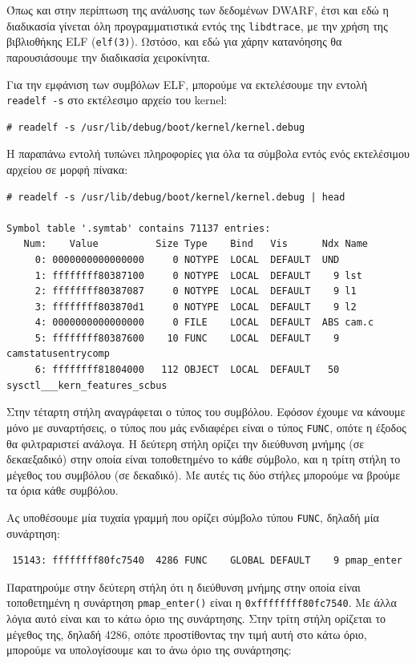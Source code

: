 \documentclass[12pt]{article}
\begin{document}
Όπως και στην περίπτωση της ανάλυσης των δεδομένων DWARF, έτσι και εδώ η
διαδικασία γίνεται όλη προγραμματιστικά εντός της \lstinline{libdtrace}, με την
χρήση της βιβλιοθήκης ELF (\lstinline{elf(3)}). Ωστόσο, και εδώ για χάρην
κατανόησης θα παρουσιάσουμε την διαδικασία χειροκίνητα.

Για την εμφάνιση των συμβόλων ELF, μπορούμε να εκτελέσουμε την εντολή
\lstinline{readelf -s} στο εκτέλεσιμο αρχείο του kernel:

\begin{lstlisting}
# readelf -s /usr/lib/debug/boot/kernel/kernel.debug
\end{lstlisting}

Η παραπάνω εντολή τυπώνει πληροφορίες για όλα τα σύμβολα εντός ενός εκτελέσιμου
αρχείου σε μορφή πίνακα:

\begin{lstlisting}
# readelf -s /usr/lib/debug/boot/kernel/kernel.debug | head

Symbol table '.symtab' contains 71137 entries:
   Num:    Value          Size Type    Bind   Vis      Ndx Name
     0: 0000000000000000     0 NOTYPE  LOCAL  DEFAULT  UND
     1: ffffffff80387100     0 NOTYPE  LOCAL  DEFAULT    9 lst
     2: ffffffff80387087     0 NOTYPE  LOCAL  DEFAULT    9 l1
     3: ffffffff803870d1     0 NOTYPE  LOCAL  DEFAULT    9 l2
     4: 0000000000000000     0 FILE    LOCAL  DEFAULT  ABS cam.c
     5: ffffffff80387600    10 FUNC    LOCAL  DEFAULT    9 camstatusentrycomp
     6: ffffffff81804000   112 OBJECT  LOCAL  DEFAULT   50 sysctl___kern_features_scbus
\end{lstlisting}

Στην τέταρτη στήλη αναγράφεται ο τύπος του συμβόλου. Εφόσον έχουμε να κάνουμε
μόνο με συναρτήσεις, ο τύπος που μάς ενδιαφέρει είναι ο τύπος \lstinline{FUNC},
οπότε η έξοδος θα φιλτραριστεί ανάλογα. Η δεύτερη στήλη ορίζει την διεύθυνση
μνήμης (σε δεκαεξαδικό) στην οποία είναι τοποθετημένο το κάθε σύμβολο, και η
τρίτη στήλη το μέγεθος του συμβόλου (σε δεκαδικό). Με αυτές τις δύο στήλες
μπορούμε να βρούμε τα όρια κάθε συμβόλου.

Ας υποθέσουμε μία τυχαία γραμμή που ορίζει σύμβολο τύπου \lstinline{FUNC},
δηλαδή μία συνάρτηση:

\begin{lstlisting}
 15143: ffffffff80fc7540  4286 FUNC    GLOBAL DEFAULT    9 pmap_enter
\end{lstlisting}

Παρατηρούμε στην δεύτερη στήλη ότι η διεύθυνση μνήμης στην οποία είναι
τοποθετημένη η συνάρτηση \lstinline{pmap_enter()} είναι η
\lstinline{0xffffffff80fc7540}. Με άλλα λόγια αυτό είναι και το κάτω όριο της
συνάρτησης. Στην τρίτη στήλη ορίζεται το μέγεθος της, δηλαδή 4286, οπότε
προστίθοντας την τιμή αυτή στο κάτω όριο, μπορούμε να υπολογίσουμε και το άνω
όριο της συνάρτησης:
\end{document}
